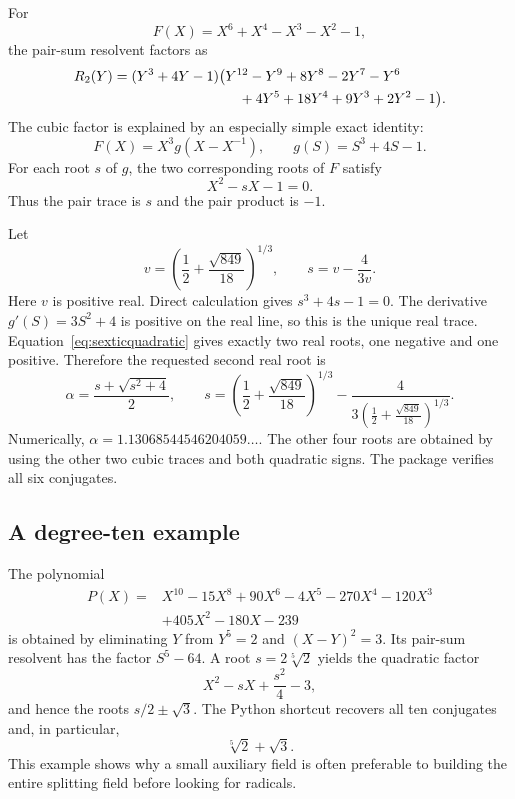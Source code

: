 \documentclass[11pt,a4paper]{article}
\theoremstyle{definition}
\theoremstyle{remark}
\begin{document}
For
\[
 F(X)=X^6+X^4-X^3-X^2-1,
\]
the pair-sum resolvent factors as
\begin{align}
 R_2(Y)={}&(Y^3+4Y-1)\bigl(Y^{12}-Y^9+8Y^8-2Y^7-Y^6\notag\\
 &\hspace{27mm}+4Y^5+18Y^4+9Y^3+2Y^2-1\bigr).
 \label{eq:sexticresolvent}
\end{align}
The cubic factor is explained by an especially simple exact identity:
\begin{equation}
 \boxed{\displaystyle F(X)=X^3 g(X-X^{-1}),\qquad g(S)=S^3+4S-1.}
 \label{eq:sexticidentity}
\end{equation}
For each root $s$ of $g$, the two corresponding roots of $F$ satisfy
\begin{equation}
 X^2-sX-1=0.
 \label{eq:sexticquadratic}
\end{equation}
Thus the pair trace is $s$ and the pair product is $-1$.

Let
\begin{equation}
 v=\left(\frac12+\frac{\sqrt{849}}{18}\right)^{1/3},
 \qquad s=v-\frac{4}{3v}.
 \label{eq:sextictrace}
\end{equation}
Here $v$ is positive real. Direct calculation gives $s^3+4s-1=0$. The derivative $g'(S)=3S^2+4$ is positive on the real line, so this is the unique real trace. Equation~\eqref{eq:sexticquadratic} gives exactly two real roots, one negative and one positive. Therefore the requested second real root is
\begin{equation}
 \boxed{\displaystyle
 \alpha=\frac{s+\sqrt{s^2+4}}2,
 \qquad
 s=\left(\frac12+\frac{\sqrt{849}}{18}\right)^{1/3}
 -\frac{4}{3\left(\frac12+\frac{\sqrt{849}}{18}\right)^{1/3}}.}
 \label{eq:sexticanswer}
\end{equation}
Numerically, $\alpha=1.13068544546204059\ldots$. The other four roots are obtained by using the other two cubic traces and both quadratic signs. The package verifies all six conjugates.

\subsection{A degree-ten example}

The polynomial
\begin{align*}
 P(X)={}&X^{10}-15X^8+90X^6-4X^5-270X^4-120X^3\\
        &+405X^2-180X-239
\end{align*}
is obtained by eliminating $Y$ from $Y^5=2$ and $(X-Y)^2=3$. Its pair-sum resolvent has the factor $S^5-64$. A root $s=2\sqrt[5]{2}$ yields the quadratic factor
\[
 X^2-sX+\frac{s^2}{4}-3,
\]
and hence the roots $s/2\pm\sqrt3$. The Python shortcut recovers all ten conjugates and, in particular,
\[
 \sqrt[5]{2}+\sqrt3.
\]
This example shows why a small auxiliary field is often preferable to building the entire splitting field before looking for radicals.
\end{document}
